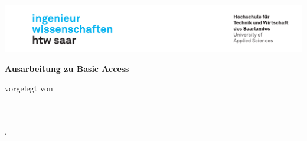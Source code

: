 \begin{titlepage}\linespread{1.5}\selectfont
\includegraphics[width=\linewidth]{Graphics/htwsaar_Logo_inwi_head_VF_4C_crop}
  \begin{center}
    \large  
    \hfill
    \vfill
    \begingroup
      \Large\bfseries\huge Ausarbeitung zu Basic Access
    \endgroup
		
% 		
%     
  \vfill
	
  \begingroup
    \Large\bfseries\myTitle
  \endgroup
	
	\bigskip
	
  vorgelegt von \\
  \vspace{\baselineskip}
  \NameL\\
  \NameY\\
	
  \vfill
	
% 	
  \vfill
	
  \myLocation, \myTime                   

    \end{center}       
\end{titlepage}   